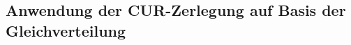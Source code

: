 \documentclass[12pt,a4paper,twoside]{article}
\begin{document}
\subsection{Anwendung der CUR-Zerlegung auf Basis der Gleichverteilung}
\label{sec:gleichv}

\end{document}
